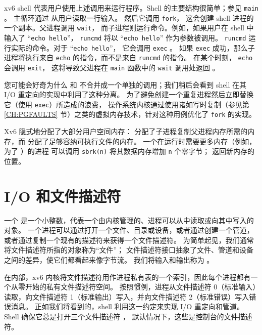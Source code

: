 xv6 shell 代表用户使用上述调用来运行程序。Shell 的主要结构很简单；参见
\lstinline{main} 
。
主循环通过
从用户读取一行输入。
然后它调用 
\lstinline{fork}， 
这会创建 shell 进程的一个副本。父进程调用
\lstinline{wait}，
而子进程则运行命令。例如，如果用户在 shell 中输入了
“\lstinline{echo hello}”，
\lstinline{runcmd}
将以
“\lstinline{echo hello}”
作为参数被调用。
\lstinline{runcmd} 
运行实际的命令。对于
“\lstinline{echo hello}”，
它会调用
\lstinline{exec} 
。
如果
\lstinline{exec}
成功，那么子进程将执行来自
\lstinline{echo}
的指令，而不是来自
\lstinline{runcmd}
的指令。
在某个时刻，
\lstinline{echo}
会调用
\lstinline{exit}，
这将导致父进程在
\lstinline{main}
函数中的
\lstinline{wait}
调用处返回
。

您可能会好奇为什么
和
不合并成一个单独的调用；我们稍后会看到
shell 在其 I/O 重定向的实现中利用了这种分离。
为了避免创建一个重复进程然后立即替换它（使用 \lstinline{exec}）所造成的浪费，
操作系统内核通过使用诸如写时复制（参见第 \ref{CH:PGFAULTS} 节）之类的虚拟内存技术，针对这种用例优化了
\lstinline{fork}
的实现。

Xv6 隐式地分配了大部分用户空间内存：
分配了子进程复制父进程内存所需的内存，而
分配了足够容纳可执行文件的内存。
一个在运行时需要更多内存（例如，为了
）的进程
可以调用
\lstinline{sbrk(n)}
将其数据内存增加
\lstinline{n}
个零字节；
返回新内存的位置。

\section{I/O 和文件描述符}

一个
是一个小整数，代表一个由内核管理的、进程可以从中读取或向其中写入的对象。
一个进程可以通过打开一个文件、目录或设备，或者通过创建一个管道，或者通过复制一个现有的描述符来获得一个文件描述符。
为简单起见，我们通常将文件描述符所指的对象称为“文件”；
文件描述符接口抽象了文件、管道和设备之间的差异，使它们都看起来像字节流。
我们将输入和输出称为 。

在内部，xv6 内核将文件描述符用作进程私有表的一个索引，因此每个进程都有一个从零开始的私有文件描述符空间。
按照惯例，进程从文件描述符 0（标准输入）读取，向文件描述符 1（标准输出）写入，并向文件描述符 2（标准错误）写入错误消息。
正如我们将看到的，shell 利用这一约定来实现 I/O 重定向和管道。Shell 确保它总是打开三个文件描述符
，
默认情况下，这些是控制台的文件描述符。

